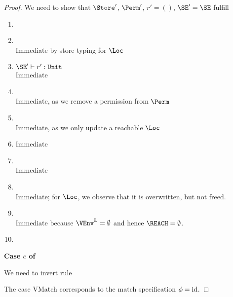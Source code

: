 \begin{proof}
  We need to show that $\Store'$, $\Perm'$, $r' = ()$, $\SE' = \SE$ fulfill
  \begin{enumerate}[({R}1)]
  \item {}
  \item {} \\
    Immediate by store typing for $\Loc$
  \item $\SE' \vdash r' : \tunit$ \\
    Immediate
  \item {} \\
    Immediate, as we remove a permission from $\Perm$
  \item {}\\
    Immediate, as we only update a reachable $\Loc$
  \item {}
    Immediate
  \item {} \\
    Immediate
  \item {} \\
    Immediate; for $\Loc$, we observe that it is overwritten, but not  freed.
  \item {} \\
    Immediate because $\Active\VEnv = \emptyset$ and hence $\REACH = \emptyset$.
  \item {}
  \end{enumerate}

  \newpage
  \textbf{Case $e$ of}

  We need to invert rule 
  \begin{mathpar}
  \end{mathpar}
  The case VMatch corresponds to the match specification
  $\etransfm = \operatorname{id}$.


\end{proof}
